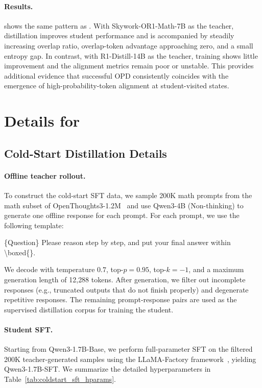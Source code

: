 \paragraph{Results.}
 shows the same pattern as .
With Skywork-OR1-Math-7B as the teacher, distillation improves student performance and is accompanied by steadily increasing overlap ratio, overlap-token advantage approaching zero, and a small entropy gap.
In contrast, with R1-Distill-14B as the teacher, training shows little improvement and the alignment metrics remain poor or unstable.
This provides additional evidence that successful OPD consistently coincides with the emergence of high-probability-token alignment at student-visited states.

\section{Details for }

\subsection{Cold-Start Distillation Details}
\label{app:coldstart_details}

\paragraph{Offline teacher rollout.}
To construct the cold-start SFT data, we sample 200K math prompts from the math subset of OpenThoughts3-1.2M~\citep{guha2025openthoughts} and use Qwen3-4B (Non-thinking) to generate one offline response for each prompt. For each prompt, we use the following template:
\begin{tcolorbox}[title=\textbf{Teacher rollout template}, colback=CornflowerBlue!20, colframe=CornflowerBlue!90!Black]
\small
\{Question\} Please reason step by step, and put your final answer within \textbackslash boxed\{\}.
\end{tcolorbox}
We decode with temperature $0.7$, top-$p=0.95$, top-$k=-1$, and a maximum generation length of 12{,}288 tokens. After generation, we filter out incomplete responses (e.g., truncated outputs that do not finish properly) and degenerate repetitive responses. The remaining prompt-response pairs are used as the supervised distillation corpus for training the student.

\paragraph{Student SFT.}
Starting from Qwen3-1.7B-Base, we perform full-parameter SFT on the filtered 200K teacher-generated samples using the LLaMA-Factory framework~\citep{zheng2024llamafactory}, yielding Qwen3-1.7B-SFT. We summarize the detailed hyperparameters in Table~\ref{tab:coldstart_sft_hparams}.

